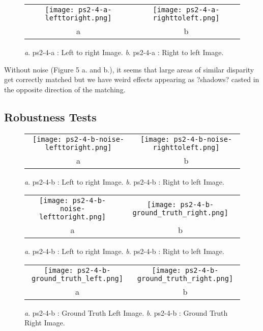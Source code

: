\documentclass[a4paper,11pt]{article}
\begin{document}
 \begin{figure}[H]
\begin{center}
\begin{tabular}{cc}
	\texttt{[image: ps2-4-a-lefttoright.png]}&
	\texttt{[image: ps2-4-a-righttoleft.png]}\\
	a&b
\end{tabular}
\end{center}
\caption{ 
\textit{a}. ps2-4-a : Left to right Image.  \textit{b}. ps2-4-a : Right to left Image. }
\label{ps2-1}
\end{figure}


Without noise (Figure 5 a. and b.), it seems that large areas of similar disparity get correctly matched but we have weird effects appearing as ?shadows? casted in the opposite direction of the matching.

\subsection{Robustness Tests}

 \begin{figure}[H]
\begin{center}
\begin{tabular}{cc}
	\texttt{[image: ps2-4-b-noise-lefttoright.png]}&
	\texttt{[image: ps2-4-b-noise-righttoleft.png]}\\
	a&b
\end{tabular}
\end{center}
\caption{ 
\textit{a}. ps2-4-b : Left to right Image.  \textit{b}. ps2-4-b : Right to left Image. }
\label{ps2-1}
\end{figure}



 \begin{figure}[H]
\begin{center}
\begin{tabular}{cc}
	\texttt{[image: ps2-4-b-noise-lefttoright.png]}&
	\texttt{[image: ps2-4-b-ground\_truth\_right.png]}\\
	a&b
\end{tabular}
\end{center}
\caption{ 
\textit{a}. ps2-4-b : Left to right Image.  \textit{b}. ps2-4-b : Right to left Image. }
\label{ps2-1}
\end{figure}


 \begin{figure}[H]
\begin{center}
\begin{tabular}{cc}
	\texttt{[image: ps2-4-b-ground\_truth\_left.png]}&
	\texttt{[image: ps2-4-b-ground\_truth\_right.png]}\\
	a&b
\end{tabular}
\end{center}
\caption{ 
\textit{a}. ps2-4-b : Ground Truth Left Image.  \textit{b}. ps2-4-b : Ground Truth Right Image. }
\label{ps2-1}
\end{figure}
\end{document}
